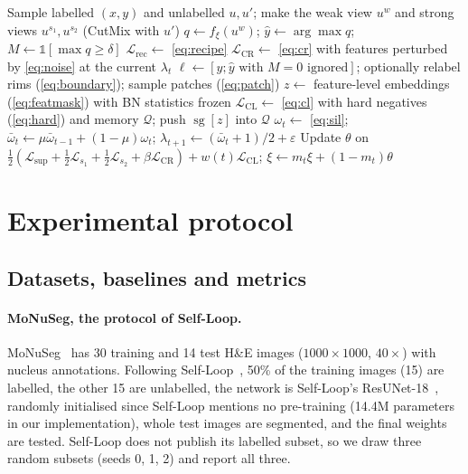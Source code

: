 \documentclass[11pt]{article}
\newcommand{\Lsup}{\mathcal{L}_{\mathrm{sup}}}
\newcommand{\Lcr}{\mathcal{L}_{\mathrm{CR}}}
\newcommand{\Lcl}{\mathcal{L}_{\mathrm{CL}}}
\newcommand{\sg}{\operatorname{sg}}
\begin{document}
\begin{algorithm}[t]
\caption{One CSSL training step (after the supervised warm-up)}
\label{alg:cssl}
\small
\begin{algorithmic}[1]
\State Sample labelled $(x,y)$ and unlabelled $u,u'$; make the weak view $u^w$ and strong views $u^{s_1},u^{s_2}$ (CutMix with $u'$)
\State $q\gets f_\xi(u^w)$; \; $\hat y\gets\arg\max q$; \; $M\gets\mathbb{1}[\max q\ge\delta]$ 
\State $\mathcal{L}_{\mathrm{rec}}\gets$ \cref{eq:recipe} 
\State $\Lcr\gets$ \cref{eq:cr} with features perturbed by \cref{eq:noise} at the current $\lambda_t$
\State $\ell\gets[y;\hat y\text{ with }M{=}0\text{ ignored}]$; optionally relabel rims (\cref{eq:boundary}); sample patches (\cref{eq:patch})
\State $z\gets$ feature-level embeddings (\cref{eq:featmask}) with BN statistics frozen
\State $\Lcl\gets$ \cref{eq:cl} with hard negatives (\cref{eq:hard}) and memory $\mathcal{Q}$; push $\sg[z]$ into $\mathcal{Q}$
\State $\omega_t\gets$ \cref{eq:sil}; \; $\bar\omega_t\gets\mu\bar\omega_{t-1}+(1-\mu)\omega_t$; \; $\lambda_{t+1}\gets(\bar\omega_t+1)/2+\varepsilon$
\State Update $\theta$ on $\tfrac12(\Lsup+\tfrac12\mathcal{L}_{s_1}+\tfrac12\mathcal{L}_{s_2}+\beta\Lcr)+w(t)\Lcl$; \; $\xi\gets m_t\xi+(1-m_t)\theta$
\end{algorithmic}
\end{algorithm}

\section{Experimental protocol}
\label{sec:protocol}

\subsection{Datasets, baselines and metrics}
\label{sec:datasets}

\paragraph{MoNuSeg, the protocol of Self-Loop.} MoNuSeg~\citep{kumar2017monuseg,kumar2020monuseg} has 30 training and 14 test H\&E images ($1000\times1000$, $40\times$) with nucleus annotations. Following Self-Loop~\citep{li2020selfloop}, 50\% of the training images (15) are labelled, the other 15 are unlabelled, the network is Self-Loop's ResUNet-18~\citep{he2016resnet,ronneberger2015unet}, randomly initialised since Self-Loop mentions no pre-training (14.4M parameters in our implementation), whole test images are segmented, and the final weights are tested. Self-Loop does not publish its labelled subset, so we draw three random subsets (seeds 0, 1, 2) and report all three.
\end{document}
